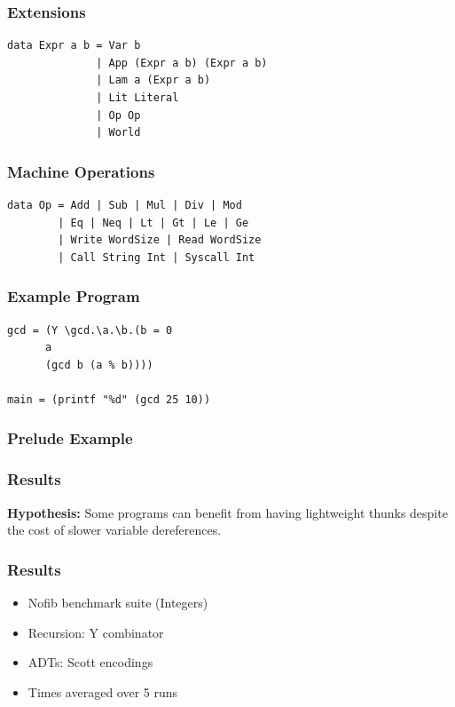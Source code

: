 \documentclass[14pt]{beamer}
\begin{document}
\begin{frame}[fragile]
\frametitle{Extensions}
\small
\begin{lstlisting}
data Expr a b = Var b 
              | App (Expr a b) (Expr a b) 
              | Lam a (Expr a b)
              | Lit Literal
              | Op Op
              | World
\end{lstlisting}
\end{frame}

\begin{frame}[fragile]
\frametitle{Machine Operations}
\small
\begin{lstlisting}
data Op = Add | Sub | Mul | Div | Mod 
        | Eq | Neq | Lt | Gt | Le | Ge 
        | Write WordSize | Read WordSize 
        | Call String Int | Syscall Int 
\end{lstlisting}
\end{frame}

\begin{frame}[fragile]
\frametitle{Example Program}
\small
\begin{lstlisting}
gcd = (Y \gcd.\a.\b.(b = 0 
      a 
      (gcd b (a % b))))

main = (printf "%d" (gcd 25 10))
\end{lstlisting}
\end{frame}

\begin{frame}[fragile]
\frametitle{Prelude Example}

\end{frame}

\begin{frame}[fragile]
\frametitle{Results}
\centering
\textbf{Hypothesis:} Some programs can benefit from having lightweight thunks
despite the cost of slower variable dereferences.
\end{frame}

\begin{frame}
\frametitle{Results}
\begin{itemize}
\item Nofib benchmark suite (Integers)
\item Recursion: Y combinator
\item ADTs: Scott encodings
\item Times averaged over 5 runs
\end{itemize}
\end{frame}

\end{document}

